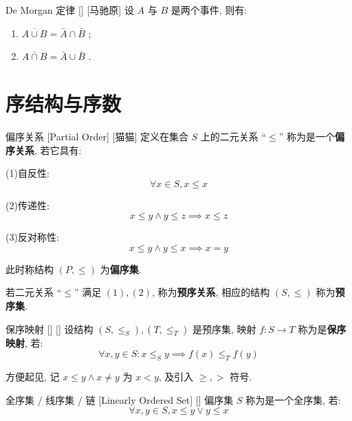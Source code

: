 \documentclass[UTF8]{ctexart}
\begin{document}
        \begin{thm}
            []
            {De Morgan 定律}
            []
            [马驰原]
            设 \(A\) 与 \(B\) 是两个事件, 则有: 

            \begin{enumerate}
                \item  \(\overline{A\cup B}=\bar{A}\cap\bar{B}\) ; 
                \item  \(\overline{A\cap B}=\bar{A}\cup\bar{B}\) . 
            \end{enumerate}
        \end{thm}

\section{序结构与序数}

    \begin{dfn}
        []
        {偏序关系}
        [Partial Order]
        [猫猫]
        定义在集合 \(S\) 上的二元关系 ``\(\leq\)'' 称为是一个\textbf{偏序关系}, 若它具有: 

        (1)自反性: 
        \[\forall x\in S, x\leq x\]
        
        (2)传递性: 
        \[x\leq y\wedge y\leq z\implies x\leq z\]

        (3)反对称性: 
        \[x\leq y\wedge y\leq x\implies x=y\]

        此时称结构 \((P,\leq)\) 为\textbf{偏序集}. 

        若二元关系 ``\(\leq\)'' 满足  \((1), (2)\), 称为\textbf{预序关系}, 相应的结构 \((S,\leq)\) 称为\textbf{预序集}. 
    \end{dfn}
    
    \begin{dfn}
        []
        {保序映射}
        []
        []
        设结构 \((S,\leq_S),(T,\leq_T)\) 是预序集, 映射 \(f:S\to T\) 称为是\textbf{保序映射}, 若: 
        \[\forall x,y\in S: x\leq_S y\implies f(x)\leq_T f(y)\]
    \end{dfn}

    方便起见, 记 \(x\leq y\wedge x\neq y\) 为 \(x<y\), 及引入 \(\geq, >\) 符号. 
    
    \begin{dfn}
        []
        {全序集 / 线序集 / 链}
        [Linearly Ordered Set]
        []
        偏序集  \(S\)  称为是一个全序集, 若: 
        \[\forall x,y\in S, x\leq y\vee y\leq x\]
    \end{dfn}
\end{document}
